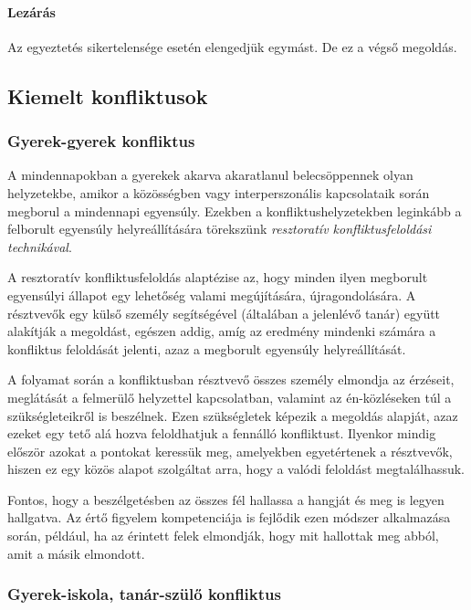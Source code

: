 \paragraph{Lezárás}

Az egyeztetés sikertelensége esetén elengedjük egymást. De ez a végső
megoldás.

\subsection{Kiemelt konfliktusok}

\subsubsection{Gyerek-gyerek
    konfliktus}

A mindennapokban a gyerekek akarva akaratlanul belecsöppennek olyan
helyzetekbe, amikor a közösségben vagy interperszonális kapcsolataik során
megborul a mindennapi egyensúly. Ezekben a konfliktushelyzetekben leginkább a
felborult egyensúly helyreállítására törekszünk \emph{resztoratív
    konfliktusfeloldási
    technikával}.

A resztoratív konfliktusfeloldás alaptézise az, hogy minden ilyen megborult
egyensúlyi állapot egy lehetőség valami megújítására, újragondolására. A
résztvevők egy külső személy segítségével (általában a jelenlévő tanár) együtt
alakítják
a megoldást, egészen addig, amíg az eredmény mindenki számára a konfliktus
feloldását jelenti, azaz a megborult egyensúly helyreállítását.

A folyamat során a konfliktusban résztvevő összes személy elmondja az érzéseit,
meglátását a felmerülő helyzettel kapcsolatban, valamint az én-közléseken túl a
szükségleteikről is beszélnek. Ezen szükségletek képezik a megoldás alapját,
azaz ezeket egy tető alá hozva feloldhatjuk a fennálló konfliktust. Ilyenkor
mindig először azokat a pontokat keressük meg, amelyekben egyetértenek a
résztvevők, hiszen ez egy közös alapot szolgáltat arra, hogy a valódi feloldást
megtalálhassuk.

Fontos, hogy a beszélgetésben az összes fél hallassa a hangját és meg is legyen
hallgatva. Az értő figyelem kompetenciája is fejlődik ezen módszer alkalmazása
során, például, ha az érintett felek elmondják, hogy mit hallottak meg abból,
amit a másik elmondott.

\subsubsection{Gyerek-iskola, tanár-szülő
    konfliktus}\label{gyerek-iskola-tanuxe1r-szuxfclux151-konfliktus}

